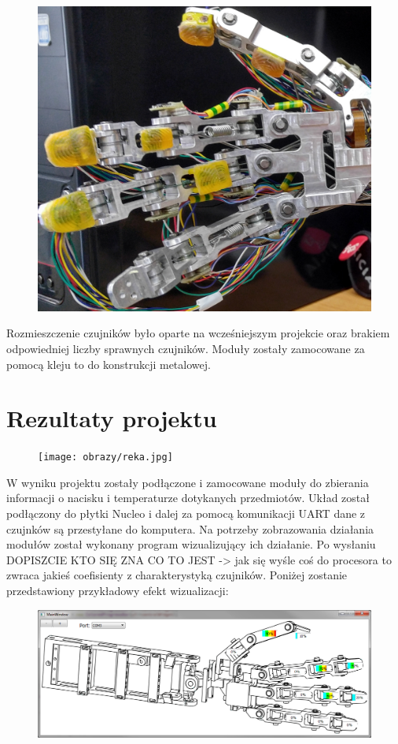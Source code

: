 \documentclass[a4paper,12pt]{article}
\begin{document}
		\begin{figure}[H]
		     	 \includegraphics[width=1\textwidth]{obrazy/dlon.jpg}
			\end{figure}
			
			Rozmieszczenie czujników było oparte na wcześniejszym projekcie oraz brakiem odpowiedniej liczby sprawnych czujników. Moduły zostały zamocowane za pomocą kleju to do konstrukcji metalowej.
		

	\section{Rezultaty projektu}	
	
	\begin{figure}[H]
		     	 \texttt{[image: obrazy/reka.jpg]}
			\end{figure}
	
	W wyniku projektu zostały podłączone i zamocowane moduły do zbierania informacji o nacisku i temperaturze dotykanych przedmiotów. Układ został podłączony do płytki Nucleo i dalej za pomocą komunikacji UART dane z czujnków są przestyłane do komputera. Na potrzeby zobrazowania działania modułów został wykonany program wizualizujący ich działanie. Po wysłaniu DOPISZCIE KTO SIĘ ZNA CO TO JEST -> jak się wyśle coś do procesora to zwraca jakieś coefisienty z charakterystyką czujników.	Poniżej zostanie przedstawiony przykładowy efekt wizualizacji:
	
	\begin{figure}[H]
		     	 \includegraphics[width=1\textwidth]{obrazy/wizualizacja.png}
			\end{figure}
			
\end{document}
